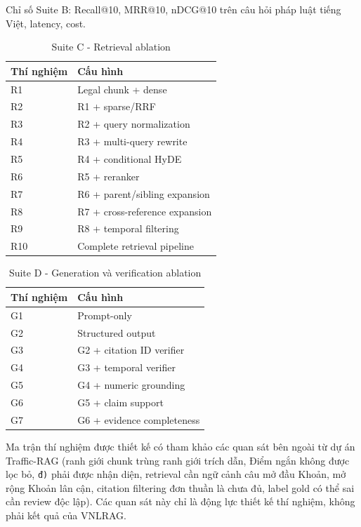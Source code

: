 \documentclass[a4paper,12pt]{extreport}
\newcommand{\code}[1]{\texttt{#1}}
\begin{document}
Chỉ số Suite B: Recall@10, MRR@10, nDCG@10 trên câu hỏi pháp luật tiếng Việt, latency, cost.

\begin{table}[H]
\caption{Suite C - Retrieval ablation}
\small
\begin{tabularx}{\textwidth}{p{1.2cm}Y}
\toprule
\textbf{Thí nghiệm} & \textbf{Cấu hình}\\
\midrule
R1 & Legal chunk + dense\\
R2 & R1 + sparse/RRF\\
R3 & R2 + query normalization\\
R4 & R3 + multi-query rewrite\\
R5 & R4 + conditional HyDE\\
R6 & R5 + reranker\\
R7 & R6 + parent/sibling expansion\\
R8 & R7 + cross-reference expansion\\
R9 & R8 + temporal filtering\\
R10 & Complete retrieval pipeline\\
\bottomrule
\end{tabularx}
\end{table}

\begin{table}[H]
\caption{Suite D - Generation và verification ablation}
\small
\begin{tabularx}{\textwidth}{p{1.2cm}Y}
\toprule
\textbf{Thí nghiệm} & \textbf{Cấu hình}\\
\midrule
G1 & Prompt-only\\
G2 & Structured output\\
G3 & G2 + citation ID verifier\\
G4 & G3 + temporal verifier\\
G5 & G4 + numeric grounding\\
G6 & G5 + claim support\\
G7 & G6 + evidence completeness\\
\bottomrule
\end{tabularx}
\end{table}

Ma trận thí nghiệm được thiết kế có tham khảo các quan sát bên ngoài từ dự án Traffic-RAG (ranh giới chunk trùng ranh giới trích dẫn, Điểm ngắn không được lọc bỏ, \code{đ)} phải được nhận diện, retrieval cần ngữ cảnh câu mở đầu Khoản, mở rộng Khoản lân cận, citation filtering đơn thuần là chưa đủ, label gold có thể sai cần review độc lập). Các quan sát này chỉ là động lực thiết kế thí nghiệm, không phải kết quả của VNLRAG.
\end{document}

